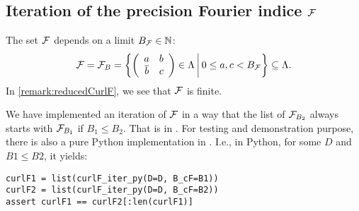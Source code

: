 \subsection{Iteration of the precision Fourier indice $\mathcal{F}$}
\label{curlFiteration}

The set $\mathcal{F}$ depends on a limit $B_{\mathcal{F}} \in \mathbb{N}$:
\[ \F = \F_B = \Set{\SimpleMatrix{a}{b}{\overline b}{c} \in \Lambda}{0 \le a , c < B_{\F}} \subseteq \Lambda . \]
In \cref{remark:reducedCurlF}, we see that $\mathcal{F}$ is finite.

We have implemented an iteration of $\mathcal{F}$ in a way that the list of $\mathcal{F}_{B_2}$ always starts with $\mathcal{F}_{B_1}$ if $B_1 \le B_2$. That is  in . For testing and demonstration purpose, there is also a pure Python implementation  in . I.e., in Python, for some $D$ and $B1 \le B2$, it yields:
\begin{lstlisting}
curlF1 = list(curlF_iter_py(D=D, B_cF=B1))
curlF2 = list(curlF_iter_py(D=D, B_cF=B2))
assert curlF1 == curlF2[:len(curlF1)]
\end{lstlisting}

